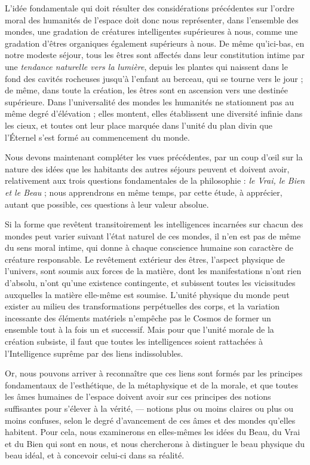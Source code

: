 \documentclass[a4paper, 11pt, oneside]{article}
\begin{document}
L'idée fondamentale qui doit résulter des considérations précédentes sur l'ordre moral des humanités de l'espace doit donc nous représenter, dans l'ensemble des mondes, une gradation de créatures intelligentes supérieures à nous, comme une gradation d'êtres organiques également supérieurs à nous. De même qu'ici-bas, en notre modeste séjour, tous les êtres sont affectés dans leur constitution intime par une \emph{tendance naturelle vers la lumière}, depuis les plantes qui naissent dans le fond des cavités rocheuses jusqu'à l'enfant au berceau, qui se tourne vers le jour ; de même, dans toute la création, les êtres sont en ascension vers une destinée supérieure. Dans l'universalité des mondes les humanités ne stationnent pas au même degré d'élévation ; elles montent, elles établissent une diversité infinie dans les cieux, et toutes ont leur place marquée dans l'unité du plan divin que l'Éternel s'est formé au commencement du monde.

Nous devons maintenant compléter les vues précédentes, par un coup d'œil sur la nature des idées que les habitants des autres séjours peuvent et doivent avoir, relativement aux trois questions fondamentales de la philosophie : \emph{le Vrai, le Bien et le Beau} ; nous apprendrons en même temps, par cette étude, à apprécier, autant que possible, ces questions à leur valeur absolue.

Si la forme que revêtent transitoirement les intelligences incarnées sur chacun des mondes peut varier suivant l'état naturel de ces mondes, il n'en est pas de même du sens moral intime, qui donne à chaque conscience humaine son caractère de créature responsable. Le revêtement extérieur des êtres, l'aspect physique de l'univers, sont soumis aux forces de la matière, dont les manifestations n'ont rien d'absolu, n'ont qu'une existence contingente, et subissent toutes les vicissitudes auxquelles la matière elle-même est soumise. L'unité physique du monde peut exister au milieu des transformations perpétuelles des corps, et la variation incessante des éléments matériels n'empêche pas le Cosmos de former un ensemble tout à la fois un et successif. Mais pour que l'unité morale de la création subsiste, il faut que toutes les intelligences soient rattachées à l'Intelligence suprême par des liens indissolubles.

Or, nous pouvons arriver à reconnaître que ces liens sont formés par les principes fondamentaux de l'esthétique, de la métaphysique et de la morale, et que toutes les âmes humaines de l'espace doivent avoir sur ces principes des notions suffisantes pour s'élever à la vérité, --- notions plus ou moins claires ou plus ou moins confuses, selon le degré d'avancement de ces âmes et des mondes qu'elles habitent. Pour cela, nous examinerons en elles-mêmes les idées du Beau, du Vrai et du Bien qui sont en nous, et nous chercherons à distinguer le beau physique du beau idéal, et à concevoir celui-ci dans sa réalité.
\end{document}
